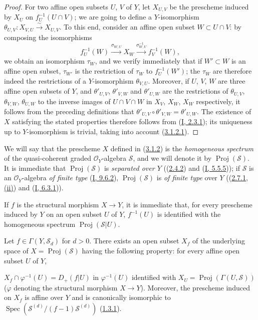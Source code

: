 \begin{proof}
For two affine open subsets $U$, $V$ of $Y$, let $X_{U,V}$ be the prescheme
induced by $X_U$ on $f_U^{-1}(U\cap V)$; we are going to define a
$Y$-isomorphism $\theta_{U,V}:X_{V,U}\xrightarrow{\sim}X_{U,V}$. To this end,
consider an affine open subset $W\subset U\cap V$: by composing the
isomorphisms
\[
  f_U^{-1}(W)\xrightarrow{\sigma_{W,U}}X_W
  \xrightarrow{\sigma_{W,V}^{-1}}f_V^{-1}(W),
\]
we obtain an isomorphism $\tau_W$, and we verify immediately that if
$W'\subset W$ is an affine open subset, $\tau_{W'}$ is the restriction of
$\tau_W$ to $f_U^{-1}(W')$; the $\tau_W$ are therefore indeed the
restrictions of a $Y$-isomorphism $\theta_{V,U}$. Moreover, if $U$, $V$, $W$
are three affine open subsets of $Y$, and $\theta'_{U,V}$, $\theta'_{V,W}$
and $\theta'_{U,W}$ are the restrictions of $\theta_{U,V}$, $\theta_{V,W}$,
$\theta_{U,W}$ to the inverse images of $U\cap V\cap W$ in $X_V$, $X_W$,
$X_W$ respectively, it follows from the preceding definitions that
$\theta'_{U,V}\circ\theta'_{V,W}=\theta'_{U,W}$. The existence of $X$
satisfying the stated properties therefore follows from
(\hyperref[I.2.3.1]{I, 2.3.1}); its uniqueness up to $Y$-isomorphism is
trivial, taking into account (\hyperref[II.3.1.2.1]{3.1.2.1}).
\end{proof}

\begin{env}[3.1.3]
\label{II.3.1.3}
We will say that the prescheme $X$ defined in
(\hyperref[II.3.1.2]{3.1.2}) is the \emph{homogeneous spectrum} of the
quasi-coherent graded $\mathcal{O}_Y$-algebra $\mathcal{S}$, and we will
denote it by $\operatorname{Proj}(\mathcal{S})$. It is immediate that
$\operatorname{Proj}(\mathcal{S})$ is \emph{separated over $Y$}
((\hyperref[II.2.4.2]{2.4.2}) and
(\hyperref[I.5.5.5]{I, 5.5.5})); if $\mathcal{S}$ is an
$\mathcal{O}_Y$-algebra \emph{of finite type}
(\hyperref[I.9.6.2]{I, 9.6.2}), $\operatorname{Proj}(\mathcal{S})$ is
\emph{of finite type} over $Y$ ((\hyperref[II.2.7.1]{2.7.1, (ii)}) and
(\hyperref[I.6.3.1]{I, 6.3.1})).

If $f$ is the structural morphism $X\to Y$, it is immediate that, for every
prescheme induced by $Y$ on an open subset $U$ of $Y$, $f^{-1}(U)$ is
identified with the homogeneous spectrum $\operatorname{Proj}(\mathcal{S}|U)$.
\end{env}

\begin{proposition}[3.1.4]
\label{II.3.1.4}
Let $f\in\Gamma(Y,\mathcal{S}_d)$ for $d>0$. There exists an open subset
$X_f$ of the underlying space of $X=\operatorname{Proj}(\mathcal{S})$ having
the following property: for every affine open subset $U$ of $Y$,


$X_f\cap\varphi^{-1}(U)=D_+(f|U)$ in $\varphi^{-1}(U)$ identified with
$X_U=\operatorname{Proj}(\Gamma(U,\mathcal{S}))$ ($\varphi$ denoting the
structural morphism $X\to Y$). Moreover, the prescheme induced on $X_f$ is
affine over $Y$ and is canonically isomorphic to
$\operatorname{Spec}(\mathcal{S}^{(d)}/(f-1)\mathcal{S}^{(d)})$
(\hyperref[II.1.3.1]{1.3.1}).
\end{proposition}

